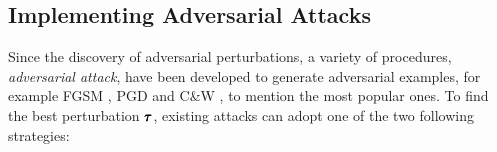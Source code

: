 \subsection{Implementing Adversarial Attacks}
\label{subsection:ch2-adversarial_attacks}

Since the discovery of adversarial perturbations, a variety of procedures, \aka \emph{adversarial attack}, have been developed to generate adversarial examples, for example FGSM \cite{goodfellow2014explaining}, PGD \cite{madry2018towards} and C\&W \cite{carlini2017towards}, to mention the most popular ones.
To find the best perturbation $\pmb{\tau}$, existing attacks can adopt one of the two following strategies:

